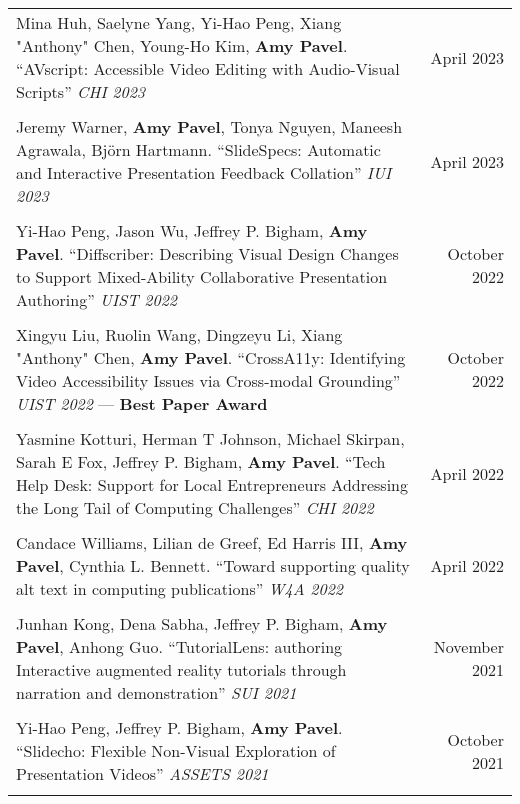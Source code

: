 \begin{longtable}{Xr}
	Mina Huh, Saelyne Yang, Yi-Hao Peng, Xiang "Anthony" Chen, Young-Ho Kim, \textbf{Amy Pavel}. ``AVscript: Accessible Video Editing with Audio-Visual Scripts'' \textit{CHI 2023} & April 2023 \\
	\\

	Jeremy Warner, \textbf{Amy Pavel}, Tonya Nguyen, Maneesh Agrawala, Björn Hartmann. ``SlideSpecs: Automatic and Interactive Presentation Feedback Collation'' \textit{IUI 2023} & April 2023 \\
	\\

	Yi-Hao Peng, Jason Wu, Jeffrey P. Bigham, \textbf{Amy Pavel}. ``Diffscriber: Describing Visual Design Changes to Support Mixed-Ability Collaborative Presentation Authoring'' \textit{UIST 2022} & October 2022 \\
	\\

	Xingyu Liu, Ruolin Wang, Dingzeyu Li, Xiang "Anthony" Chen, \textbf{Amy Pavel}. ``CrossA11y: Identifying Video Accessibility Issues via Cross-modal Grounding'' \textit{UIST 2022} --- \textbf{Best Paper Award} & October 2022 \\
	\\

	Yasmine Kotturi, Herman T Johnson, Michael Skirpan, Sarah E Fox, Jeffrey P. Bigham, \textbf{Amy Pavel}. ``Tech Help Desk: Support for Local Entrepreneurs Addressing the Long Tail of Computing Challenges'' \textit{CHI 2022} & April 2022 \\
	\\

	Candace Williams, Lilian de Greef, Ed Harris III, \textbf{Amy Pavel}, Cynthia L. Bennett. ``Toward supporting quality alt text in computing publications'' \textit{W4A 2022} & April 2022 \\
	\\

	Junhan Kong, Dena Sabha, Jeffrey P. Bigham, \textbf{Amy Pavel}, Anhong Guo. ``TutorialLens: authoring Interactive augmented reality tutorials through narration and demonstration'' \textit{SUI 2021} & November 2021 \\
	\\

	Yi-Hao Peng, Jeffrey P. Bigham, \textbf{Amy Pavel}. ``Slidecho: Flexible Non-Visual Exploration of Presentation Videos'' \textit{ASSETS 2021} & October 2021 \\
	\\


\end{longtable}
